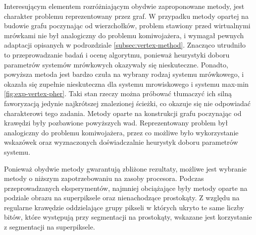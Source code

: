 {{        Interesującym elementem rozróżniającym obydwie zaproponowane metody, jest charakter problemu reprezentowany
        przez graf. W przypadku metody opartej na budowie grafu poczynając od wierzchołków, problem stawiony przed
        wirtualnymi mrówkami nie był analogiczny do problemu komiwojażera, i wymagał pewnych adaptacji opisanych w
        podrozdziale \ref{subsec:vertex-method}. Znacząco utrudniło to przeprowadzanie badań i ocenę algorytmu, ponieważ
        heurystyki doboru parametrów systemów mrówkowych okazywały się nieskuteczne. Ponadto, powyższa metoda jest
        bardzo czuła na wybrany rodzaj systemu mrówkowego, i okazała się zupełnie nieskuteczna dla systemu mrowiskowego
        i systemu max-min \ref{fig:exp-vertex-pher}. Taki stan rzeczy można próbować tłumaczyć ich silną faworyzacją
        jedynie najkrótszej znalezionej ścieżki, co okazuje się nie odpowiadać charakterowi tego zadania. Metody oparte
        na konstrukcji grafu poczynając od krawędzi były pozbawione powyższych wad. Reprezentowany problem był
        analogiczny do problemu komiwojażera, przez co możliwe było wykorzystanie wskazówek oraz wyznaczonych
        doświadczalnie heurystyk doboru parametrów systemu.

        Ponieważ obydwie metody gwarantują zbliżone rezultaty, możliwe jest wybranie metody o niższym zapotrzebowaniu na
        zasoby procesora. Podczas przeprowadzanych eksperymentów, najmniej obciążające były metody oparte na podziale
        obrazu na superpiksele oraz nienachodzące prostokąty. Z względu na regularne krawędzie oddzielające grupy
        pikseli w których ukryto te same liczby bitów, które występują przy segmentacji na prostokąty, wskazane jest
        korzystanie z segmentacji na superpiksele.
    }
}




